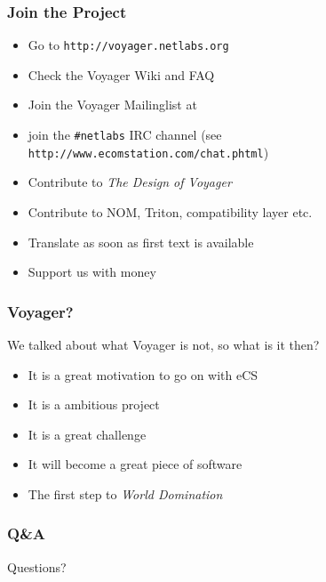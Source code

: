 \documentclass{beamer}
\begin{document}
\begin{frame}
\frametitle{Join the Project}
\begin{itemize}[<+->]
  \item Go to \texttt{http://voyager.netlabs.org}
  \item Check the Voyager Wiki and FAQ
  \item Join the Voyager Mailinglist at
  \item join the \texttt{\#netlabs} IRC channel (see
  \texttt{http://www.ecomstation.com/chat.phtml}) 
  \item Contribute to \textit{The Design of Voyager}
  \item Contribute to NOM, Triton, compatibility layer etc.
  \item Translate as soon as first text is available
  \item Support us with money
\end{itemize}
\end{frame}

\begin{frame}
\frametitle{Voyager?}
We talked about what Voyager is not, so what is it then?
\begin{itemize}[<+->]
  \item It is a great motivation to go on with eCS
  \item It is a ambitious project
  \item It is a great challenge
  \item It will become a great piece of software
  \item The first step to \textit{World Domination\texttrademark}
\end{itemize}
\end{frame}


\begin{frame}
\frametitle{Q\&A}
	Questions?
\end{frame}

% 
\end{document}
